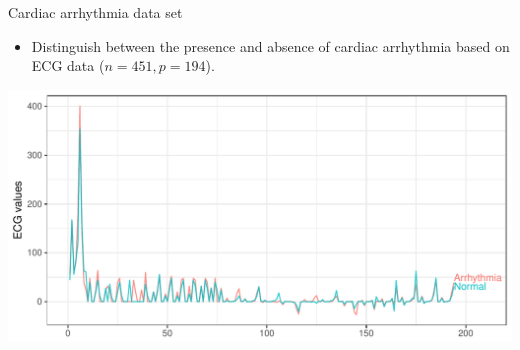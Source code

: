\documentclass{beamer}\usepackage[]{graphicx}\usepackage[]{color}
\makeatletter
\def\maxwidth{ %
  \ifdim\Gin@nat@width>\linewidth
    \linewidth
  \else
    \Gin@nat@width
  \fi
}
\newenvironment{knitrout}{}{} %
\makeatother
\begin{document}
\begin{frame}[fragile]{Cardiac arrhythmia data set}
\vspace{-20pt}
\begin{itemize}
\item Distinguish between the presence and absence of cardiac arrhythmia based on ECG data ($n = 451, p = 194$).
\end{itemize}

\begin{knitrout}\small
{}\color{fgcolor}

{\centering \includegraphics[width=\maxwidth]{figure/plot_cardiac-1} 

}



\end{knitrout}
\end{frame}
\end{document}

